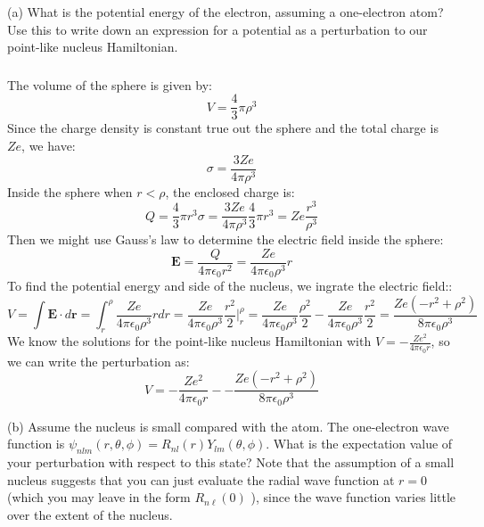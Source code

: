 \documentclass[12pt]{article}
\begin{document}
(a) What is the potential energy of the electron, assuming a one-electron atom? Use this to write down an expression for a potential as a perturbation to our point-like nucleus Hamiltonian.
\subsubsection{}
The volume of the sphere is given by:
\begin{equation}
  V = \frac{4}{3} \pi \rho^3
\end{equation}
Since the charge density is constant true out the sphere and the total charge is $Ze$, we have:
\begin{equation}
  \sigma  = \frac{3Ze}{4\pi\rho^3}
\end{equation}
Inside the sphere when $r < \rho$, the enclosed charge is:
\begin{equation}
  Q = \frac{4}{3} \pi r^3 \sigma = \frac{3Ze}{4\pi\rho^3} \frac{4}{3} \pi r^3 = Ze \frac{r^3}{\rho^3}
\end{equation}
Then we might use Gauss's law to determine the electric field inside the sphere:
\begin{equation}
  \mathbf{E} = \frac{Q}{4\pi\epsilon_0 r^2} = \frac{Ze}{4\pi\epsilon_0\rho^3} r
\end{equation}
To find the potential energy and side of the nucleus, we ingrate the electric field::
\begin{equation}
  V = \int \mathbf{E} \cdot d\mathbf{r} = \int_{r}^{\rho } \frac{Ze}{4\pi\epsilon_0\rho^3} r dr = \frac{Ze}{4\pi\epsilon_0\rho^3} \frac{r^2}{2} \Big|_{r}^{\rho} = \frac{Ze}{4\pi\epsilon_0\rho^3} \frac{\rho^2}{2} - \frac{Ze}{4\pi\epsilon_0\rho^3} \frac{r^2}{2} = \frac{Ze(-r^2 + \rho^2)}{8\pi\epsilon_0\rho^3}
\end{equation}
We know the solutions for the point-like nucleus Hamiltonian with $V = -\frac{Ze^2}{4\pi\epsilon_0 r}$, so we can write the perturbation as:
\begin{equation}
  V = -\frac{Ze^2}{4\pi\epsilon_0 r} - -\frac{Ze(-r^2 + \rho^2)}{8\pi\epsilon_0\rho^3}
\end{equation}



(b) Assume the nucleus is small compared with the atom. The one-electron wave function is $\psi_{n l m}(r, \theta, \phi)=R_{n l}(r) Y_{l m}(\theta, \phi)$. What is the expectation value of your perturbation with respect to this state? Note that the assumption of a small nucleus suggests that you can just evaluate the radial wave function at $r=0$ (which you may leave in the form $R_{n \ell}(0)$ ), since the wave function varies little over the extent of the nucleus.
\end{document}
